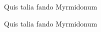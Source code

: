 \documentclass[
   \selectedoptions
  ]
  {aipproc}
\begin{document}
\begin{figure}
  \caption{Quis talia fando Myrmidonum}
\end{figure}


\begin{figure}[b]
\caption{Quis talia fando Myrmidonum}
\end{figure}
\end{document}

